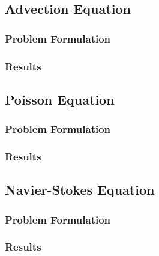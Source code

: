 \subsection{Advection Equation}
\subsubsection{Problem Formulation}
\subsubsection{Results}

\subsection{Poisson Equation}
\subsubsection{Problem Formulation}
\subsubsection{Results}

\subsection{Navier-Stokes Equation}
\subsubsection{Problem Formulation}
\subsubsection{Results}
